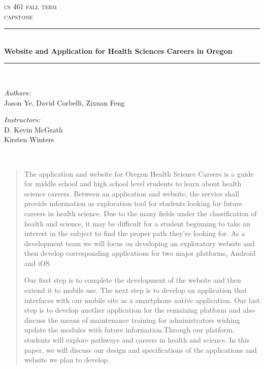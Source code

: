 \documentclass[letterpaper,10pt]{article}
\begin{document}
    \begin{titlepage}
    \newcommand{\HRule}{\rule{\linewidth}{0.5mm}}
    \center 
    \textsc{\Large cs 461 fall term}\\[0.5cm] 
    \textsc{\Large capstone}\\[0.5cm] 
    \HRule \\[0.4cm]
    { \huge \bfseries Website and Application for Health Sciences Careers in Oregon }\\[0.5cm] %
    \HRule \\[1.5cm]
    \begin{minipage}{0.4\textwidth}
        \begin{flushleft} \large
        \emph{Authors:}\\
          Jason Ye, David Corbelli, Zixuan Feng \linebreak
        \end{flushleft}
    \end{minipage}
    \begin{minipage}{0.4\textwidth}
        \begin{flushright} \large
        \emph{Instructors:} \\
        D. Kevin McGrath
		\\
        Kirsten Winters
        \end{flushright}
    \end{minipage}\\[2cm]
    \begin{abstract}
    \item
The application and website for Oregon Health Science Careers is a guide for middle school and high school level students to learn about health science careers. Between an application and website, the service shall provide information as exploration tool for students looking for future careers in health science. Due to the many fields under the classification of health and science, it may be difficult for a student beginning to take an interest in the subject to find the proper path they’re looking for. As a development team we will focus on developing an exploratory website and then develop corresponding applications for two major platforms, Android and iOS.

Our first step is to complete the development of the website and then extend it to mobile use. The next step is to develop an application that interfaces with our mobile site as a smartphone native application.  Our last step is to develop another application for the remaining platform and also discuss the means of maintenance training for administrators wishing update the modules with future information.Through our platform, students will explore pathways and careers in health and science.  In this paper, we will discuss our design and specifications of the applications and website we plan to develop. 
    \end{abstract}
   

    \end{titlepage}
    
\end{document}
